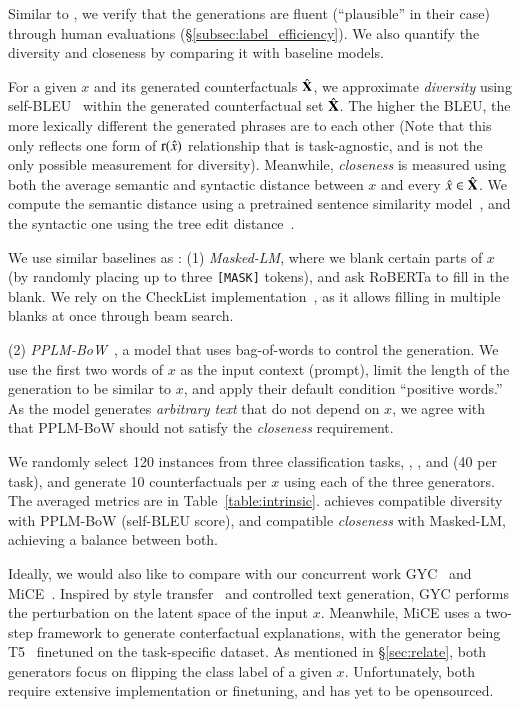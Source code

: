 Similar to \citet{madaan2020generate}, we verify that the \sysname generations are fluent (``plausible'' in their case) through human evaluations (\S\ref{subsec:label_efficiency}).
We also quantify the diversity and closeness by comparing it with baseline models.

For a given $x$ and its generated counterfactuals $\hat{\mathbf{X}}$, we approximate \emph{diversity} using self-BLEU~\cite{malandrakis-etal-2019-controlled, zhu2018texygen} within the generated counterfactual set $\hat{\mathbf{X}}$.
The higher the BLEU, the more lexically different the generated phrases are to each other (Note that this only reflects one form of $\operatorname*{r}(\hat{x})$ relationship that is task-agnostic, and is not the only possible measurement for diversity). 
Meanwhile, \emph{closeness} is measured using both the average semantic and syntactic distance between $x$ and every $\hat{x} \in \hat{\mathbf{X}}$.
We compute the semantic distance using a pretrained sentence similarity model~\cite{reimers-2019-sentence-bert}, and the syntactic one using the tree edit distance~\cite{zhang1989simple}.


We use similar baselines as \citet{madaan2020generate}: 
(1) \emph{Masked-LM}, where we blank certain parts of $x$ (by randomly placing up to three \texttt{[MASK]} tokens), and ask RoBERTa to fill in the blank.
We rely on the CheckList implementation~\cite{checklist:acl20}, as it allows filling in multiple blanks at once through beam search. 

(2) \emph{PPLM-BoW}~\cite{Dathathri2020Plug}, a model that uses bag-of-words to control the generation.
We use the first two words of $x$ as the input context (prompt), limit the length of the generation to be similar to $x$, and apply their default condition ``positive words.''
As the model generates \emph{arbitrary text} that do not depend on $x$, we agree with \citet{madaan2020generate} that PPLM-BoW should not satisfy the \emph{closeness} requirement.

We randomly select 120 instances from three classification tasks, \qqp, \nli, and \sst (40 per task), and generate 10 counterfactuals per $x$ using each of the three generators.
The averaged metrics are in Table~\ref{table:intrinsic}.
\sysname achieves compatible diversity with PPLM-BoW (self-BLEU score), and compatible \emph{closeness} with Masked-LM, achieving a balance between both.


Ideally, we would also like to compare \sysname with our concurrent work GYC~\cite{madaan2020generate} and MiCE~\cite{ross2020explaining}.
Inspired by style transfer~\cite{yang2018unsupervised} and controlled text generation, GYC performs the perturbation on the latent space of the input $x$.
Meanwhile, MiCE uses a two-step framework to generate conterfactual explanations, with the generator being T5~\cite{JMLR:v21:20-074} finetuned on the task-specific dataset.
As mentioned in \S\ref{sec:relate}, both generators focus on flipping the class label of a given $x$.
Unfortunately, both require extensive implementation or finetuning, and has yet to be opensourced.

